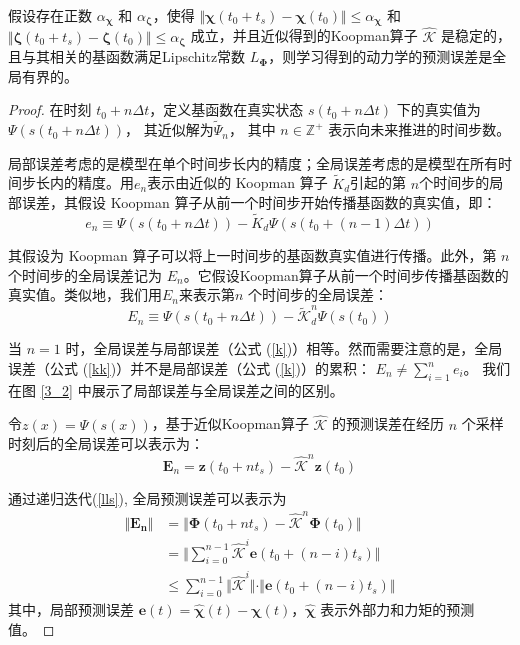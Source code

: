 \documentclass[lang=chs, degree=master, blindreview=false, winfonts=true]{yanputhesis}
\begin{document}
\begin{theorem}\label{error_boundness}
	假设存在正数 $\alpha_{\bm{\chi}}$ 和 $\alpha_{\bm{\zeta}}$，使得 $\Vert \bm{\chi}(t_0+t_s)-\bm{\chi}(t_0)\Vert \le \alpha_{\bm{\chi}}$ 和 $\Vert \bm{\zeta}(t_0+t_s) - \bm{\zeta}(t_0) \Vert \le \alpha_{\bm{\zeta}}$ 成立，并且近似得到的Koopman算子 $\hat{\bm{\mathcal{K}}}$ 是稳定的，且与其相关的基函数满足Lipschitz常数 $L_{\bm{\Phi}}$，则学习得到的动力学的预测误差是全局有界的。
\end{theorem}
\begin{proof}
	
在时刻 \( t_0 + n\Delta t \)，定义基函数在真实状态 \( s(t_0 + n\Delta t) \) 下的真实值为 
$
\Psi(s(t_0 + n\Delta t))$，
其近似解为$
\tilde{\Psi}_n
$，
其中 $ n \in \mathbb{Z}^+ $ 表示向未来推进的时间步数。

局部误差考虑的是模型在单个时间步长内的精度；全局误差考虑的是模型在所有时间步长内的精度。用$e_n$表示由近似的 Koopman 算子 \( \tilde{K}_d \)引起的第 
\( n \)个时间步的局部误差，其假设 Koopman 算子从前一个时间步开始传播基函数的真实值，即：
\begin{equation}
	e_n\equiv\Psi(s(t_0+n\Delta t))-\tilde{K}_d\Psi(s(t_0+(n-1)\Delta t))
	\label{k}
\end{equation}

其假设为 Koopman 算子可以将上一时间步的基函数真实值进行传播。此外，第 \( n \) 个时间步的全局误差记为 $E_n$。它假设Koopman算子从前一个时间步传播基函数的真实值。类似地，我们用$E_n$来表示第\( n \) 个时间步的全局误差：	
\begin{equation}
	E_n\equiv\Psi(s(t_0+n\Delta t))-\tilde{\mathcal{K}}_d^n\Psi(s(t_0))
	\label{kk}
\end{equation}


当 \( n = 1 \) 时，全局误差与局部误差（公式 (\ref{k})）相等。然而需要注意的是，全局误差（公式 (\ref{kk})）并不是局部误差（公式 (\ref{k})）的累积： 
$
E_n \neq \sum_{i=1}^n e_i
$。
我们在图 \ref{3_2} 中展示了局部误差与全局误差之间的区别。

	令$z(x)=\Psi(s(x))$，基于近似Koopman算子 $\hat{\bm{\mathcal{K}}}$ 的预测误差在经历 $n$ 个采样时刻后的全局误差可以表示为：
	\begin{equation}
		\bm{E}_n = \bm{z}(t_0 + nt_s) - \hat{\bm{\mathcal{K}}}^n \bm{z}(t_0)
	\end{equation}


	
	通过递归迭代(\ref{lls}), 全局预测误差可以表示为
	\[
	\begin{aligned}
		\Vert \bm{E_n} \Vert &= \Vert \bm{\Phi}(t_0+nt_s) -\hat{\bm{\mathcal{K}}}^n\bm{\Phi}(t_0) \Vert  \\
		&=\Vert \sum_{i=0}^{n-1}\hat{\bm{\mathcal{K}}}^i\bm{e}(t_0+(n-i)t_s)\Vert \\
		&\le \sum_{i=0}^{n-1}\Vert \hat{\bm{\mathcal{K}}}^i\Vert \cdot \Vert \bm{e}(t_0+(n-i)t_s) \Vert
	\end{aligned}
	\]
	其中，局部预测误差 $\bm{e}(t)=\bm{\hat{\chi}}(t)-\bm{\chi}(t)$，$\bm{\hat{\chi}}$ 表示外部力和力矩的预测值。
	

\end{proof}
\end{document}
